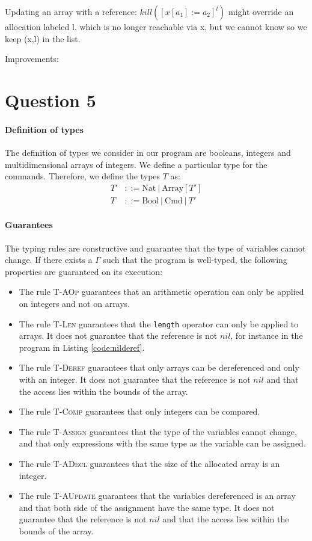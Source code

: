 \documentclass{article}
\begin{document}
Updating an array with a reference: \( kill([x[a_1] := a_2]^l) \)  might override an allocation labeled l, which is no longer reachable via x, but we cannot know so we keep (x,l) in the list.

Improvements:


\section*{Question 5}
\paragraph{Definition of types}
The definition of types we consider in our program are booleans, integers and multidimensional arrays of integers. We define a particular type for the commands. Therefore, we define the types \(T\) as:
\begin{equation*} \label{eq1}
\begin{split}
T' & ::= \text{Nat}\ |\ \text{Array}[T']\\
T  & ::= \text{Bool}\ |\ \text{Cmd}\ |\ T'
\end{split}
\end{equation*}

\paragraph{Guarantees}
The typing rules are constructive and guarantee that the type of variables cannot change.
If there exists a \(\Gamma\) such that the program is well-typed, the following properties are guaranteed on its execution:
\begin{itemize}
 \item The rule \textsc{T-AOp} guarantees that an arithmetic operation can only be applied on integers and not on arrays.
 \item The rule \textsc{T-Len} guarantees that the \texttt{length} operator can only be applied to arrays. It does not guarantee that the reference is not \(nil\), for instance in the program in Listing \ref{code:nilderef}.
 \item The rule \textsc{T-Deref} guarantees that only arrays can be dereferenced and only with an integer. It does not guarantee that the reference is not \(nil\) and that the access lies within the bounds of the array.
 \item The rule \textsc{T-Comp} guarantees that only integers can be compared.
 \item The rule \textsc{T-Assign} guarantees that the type of the variables cannot change, and that only expressions with the same type as the variable can be assigned. 
 \item The rule \textsc{T-ADecl} guarantees that the size of the allocated array is an integer.
 \item The rule \textsc{T-AUpdate} guarantees that the variables dereferenced is an array and that both side of the assignment have the same type. It does not guarantee that the reference is not \(nil\) and that the access lies within the bounds of the array.
\end{itemize}
\end{document}
